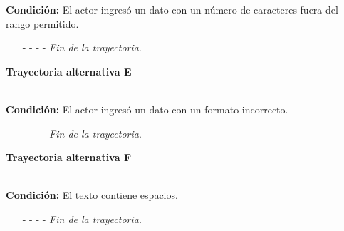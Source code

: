 \noindent \textbf{Condición:} El actor ingresó un dato con un número de caracteres fuera del rango permitido.
\begin{enumerate}
	\UCpaso[\UCsist] Muestra el mensaje  señalando el campo que presenta el error en la pantalla .
	\UCpaso Regresa al paso \ref{CU12.1.4-P3} de la trayectoria principal.
	\item[- -] - - {\em {Fin de la trayectoria}}.%
\end{enumerate}
\hypertarget{CU12-1-4:TAE}{\textbf{Trayectoria alternativa E}}\\
\noindent \textbf{Condición:} El actor ingresó un dato con un formato incorrecto.
\begin{enumerate}
	\UCpaso[\UCsist] Muestra el mensaje  señalando el campo que presenta el error en la pantalla .
	\UCpaso Regresa al paso \ref{CU12.1.4-P3} de la trayectoria principal.
	\item[- -] - - {\em {Fin de la trayectoria}}.
\end{enumerate}
\hypertarget{CU12-1-4:TAH}{\textbf{Trayectoria alternativa F}}\\
\noindent \textbf{Condición:} El texto contiene espacios.
\begin{enumerate}
	\UCpaso[\UCsist] Sustituye los espacios por guiones bajos.
	\UCpaso Continua en el \ref{CU12.1.4-TA1} de la trayectoria alternativa A.
	\item[- -] - - {\em {Fin de la trayectoria}}.
\end{enumerate}